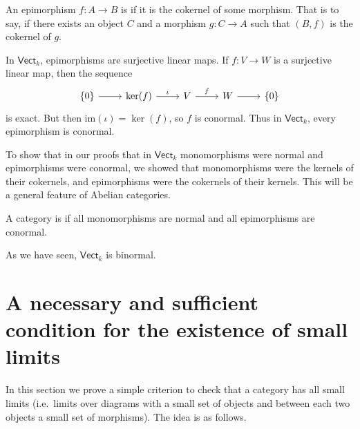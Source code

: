 \documentclass[notes.tex]{subfiles}
\begin{document}
\begin{definition}
  \label{def:conormalepimorphism}
  An epimorphism $f\colon A \to B$ is  if it is the cokernel of some morphism. That is to say, if there exists an object $C$ and a morphism $g\colon C \to A$ such that $(B, f)$ is the cokernel of $g$.
\end{definition}

\begin{example}
  In $\mathsf{Vect}_{k}$, epimorphisms are surjective linear maps. If $f\colon V \to W$ is a surjective linear map, then the sequence
  \begin{equation*}
    \begin{tikzcd}
      \{0\} \arrow[r] & \ker(f) \arrow[r, "\iota"] & V \arrow[r, "f"] & W \arrow[r] & \{0\}
    \end{tikzcd}
  \end{equation*}
  is exact. But then $\mathrm{im}(\iota) = \ker(f)$, so $f$ is conormal. Thus in $\mathsf{Vect}_{k}$, every epimorphism is conormal.
\end{example}

\begin{note}
  To show that in our proofs that in $\mathsf{Vect}_{k}$ monomorphisms were normal and epimorphisms were conormal, we showed that monomorphisms were the kernels of their cokernels, and epimorphisms were the cokernels of their kernels. This will be a general feature of Abelian categories.
\end{note}

\begin{definition}
  \label{def:binormalcategory}
  A category is  if all monomorphisms are normal and all epimorphisms are conormal.
\end{definition}

\begin{example}
  As we have seen, $\mathsf{Vect}_{k}$ is binormal.
\end{example}


\section{A necessary and sufficient condition for the existence of small limits}

In this section we prove a simple criterion to check that a category has all small limits (i.e.\ limits over diagrams with a small set of objects and between each two objects a small set of morphisms). The idea is as follows.
\end{document}
